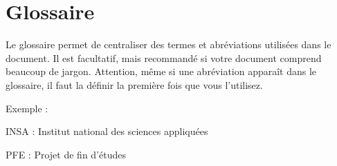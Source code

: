 \section*{Glossaire}

Le glossaire permet de centraliser des termes et abréviations utilisées dans le document. Il est facultatif, mais recommandé si votre document comprend beaucoup de jargon. Attention, même si une abréviation apparaît dans le glossaire, il faut la définir la première fois que vous l’utilisez.

Exemple :

INSA : Institut national des sciences appliquées

PFE : Projet de fin d’études
